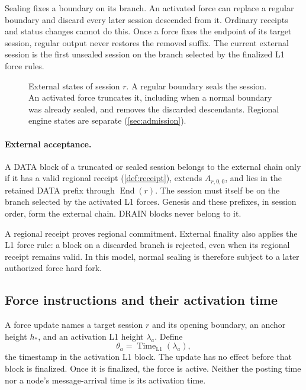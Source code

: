 \documentclass[11pt,a4paper]{article}
\newcommand{\End}{\operatorname{End}}
\begin{document}
Sealing fixes a boundary on its branch. An activated force can replace
a regular boundary and discard every later session descended from it.
Ordinary receipts and status changes cannot do this. Once a force fixes
the endpoint of its target session, regular output never restores the
removed suffix. The current external session is the first unsealed
session on the branch selected by the finalized L1 force rules.

\begin{figure}[htbp]\centering

\caption{External states of session $r$. A regular boundary seals the
session. An activated force truncates it, including when a normal
boundary was already sealed, and removes the discarded descendants.
Regional engine states are separate (\cref{sec:admission}).}
\label{fig:states}
\end{figure}

\paragraph{External acceptance.}
A DATA block of a truncated or sealed session belongs to the external
chain only if it has a valid regional receipt (\cref{def:receipt}),
extends $A_{r,0,0}$, and lies in the retained DATA prefix through
$\End(r)$. The session must itself be on the branch selected by the
activated L1 forces. Genesis and these prefixes, in session order,
form the external chain. DRAIN blocks never belong to it.

A regional receipt proves regional commitment. External finality also
applies the L1 force rule: a block on a discarded branch is rejected,
even when its regional receipt remains valid. In this model, normal
sealing is therefore subject to a later authorized force hard fork.

\subsection{Force instructions and their activation time}
\label{sec:force}
A force update names a target session $r$ and its opening boundary, an
anchor height $h_*$, and an activation L1 height $\lambda_a$. Define
\[
 \theta_a=\operatorname{Time}_{\mathrm{L1}}(\lambda_a),
\]
the timestamp in the activation L1 block. The update has no effect
before that block is finalized. Once it is finalized, the force is
active. Neither the posting time nor a node's message-arrival time is
its activation time.
\end{document}
